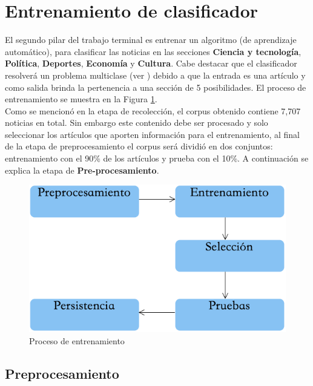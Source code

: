 \section[Entrenar C.]{Entrenamiento de clasificador}

El segundo pilar del trabajo terminal es entrenar un algoritmo (de aprendizaje automático), para clasificar las noticias en las secciones \textbf{Ciencia y tecnología}, \textbf{Política}, \textbf{Deportes}, \textbf{Economía} y \textbf{Cultura}. Cabe destacar que el clasificador resolverá un problema multiclase (ver ) debido a que la entrada es una artículo y como salida brinda la pertenencia a una sección  de 5 posibilidades. El proceso de entrenamiento se muestra en la Figura \ref{fig:cp5:procesoE}.\\


Como se mencionó en la etapa de recolección, el corpus obtenido contiene 7,707 noticias en total. Sin embargo este contenido debe ser procesado y solo seleccionar los artículos que aporten información para el entrenamiento, al final de la etapa de pre\-procesamiento el corpus será dividió en dos conjuntos: entrenamiento con el 90\% de los artículos y prueba con el 10\%. A continuación se explica la etapa de \textbf{Pre-procesamiento}.\\

\begin{figure}[h]
\centering
\includegraphics[scale=.55]{imagenes/capitulo5/Entrenamiento/Esquema.png}
\caption{Proceso de entrenamiento}
\label{fig:cp5:procesoE}
\end{figure}



\subsection{Preprocesamiento}

